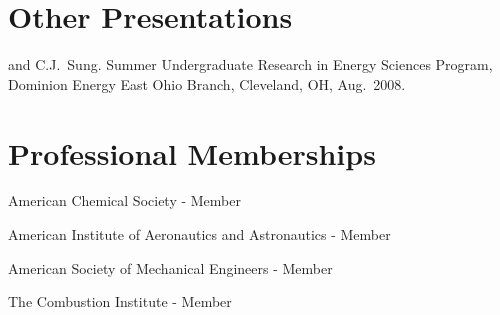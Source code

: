 \section{{\sectionfont Other Presentations}}

\begin{bibmune}
\item {} and C.J.\ Sung.  Summer
        Undergraduate Research in Energy Sciences Program, Dominion Energy East Ohio
        Branch, Cleveland, OH, Aug.\ 2008.\\
\end{bibmune}

\section{{\sectionfont Professional Memberships}}
American Chemical Society - Member

American Institute of Aeronautics and Astronautics - Member

American Society of Mechanical Engineers - Member

The Combustion Institute - Member



